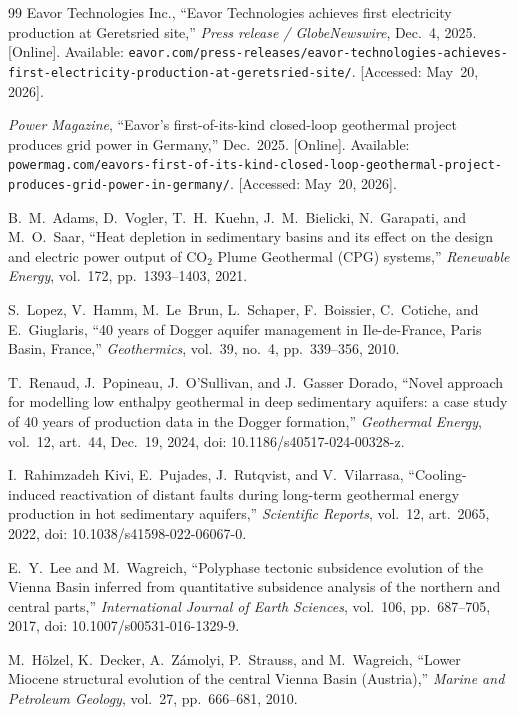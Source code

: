 \documentclass{article}
\begin{document}
\begin{thebibliography}{99}
Eavor Technologies Inc., ``Eavor Technologies achieves first electricity
production at Geretsried site,'' \emph{Press release / GlobeNewswire},
Dec.~4, 2025. [Online]. Available:
\texttt{eavor.com/press-releases/eavor-technologies-achieves-first-electricity-production-at-geretsried-site/}.
[Accessed: May~20, 2026].

\emph{Power Magazine}, ``Eavor's first-of-its-kind closed-loop geothermal
project produces grid power in Germany,'' Dec.\ 2025. [Online]. Available:
\texttt{powermag.com/eavors-first-of-its-kind-closed-loop-geothermal-project-produces-grid-power-in-germany/}.
[Accessed: May~20, 2026].

B.~M.~Adams, D.~Vogler, T.~H.~Kuehn, J.~M.~Bielicki, N.~Garapati, and
M.~O.~Saar, ``Heat depletion in sedimentary basins and its effect on the
design and electric power output of CO$_2$ Plume Geothermal (CPG) systems,''
\emph{Renewable Energy}, vol.~172, pp.~1393--1403, 2021.

S.~Lopez, V.~Hamm, M.~Le~Brun, L.~Schaper, F.~Boissier, C.~Cotiche, and
E.~Giuglaris, ``40 years of Dogger aquifer management in Ile-de-France,
Paris Basin, France,'' \emph{Geothermics}, vol.~39, no.~4, pp.~339--356,
2010.

T.~Renaud, J.~Popineau, J.~O'Sullivan, and J.~Gasser Dorado, ``Novel
approach for modelling low enthalpy geothermal in deep sedimentary
aquifers: a case study of 40 years of production data in the Dogger
formation,'' \emph{Geothermal Energy}, vol.~12, art.~44, Dec.~19, 2024,
doi: 10.1186/s40517-024-00328-z.

I.~Rahimzadeh Kivi, E.~Pujades, J.~Rutqvist, and V.~Vilarrasa,
``Cooling-induced reactivation of distant faults during long-term
geothermal energy production in hot sedimentary aquifers,'' \emph{Scientific
Reports}, vol.~12, art.~2065, 2022, doi: 10.1038/s41598-022-06067-0.

E.~Y.~Lee and M.~Wagreich, ``Polyphase tectonic subsidence evolution of the
Vienna Basin inferred from quantitative subsidence analysis of the northern
and central parts,'' \emph{International Journal of Earth Sciences},
vol.~106, pp.~687--705, 2017, doi: 10.1007/s00531-016-1329-9.

M.~H\"olzel, K.~Decker, A.~Z\'amolyi, P.~Strauss, and M.~Wagreich, ``Lower
Miocene structural evolution of the central Vienna Basin (Austria),''
\emph{Marine and Petroleum Geology}, vol.~27, pp.~666--681, 2010.


\end{thebibliography}
\end{document}
